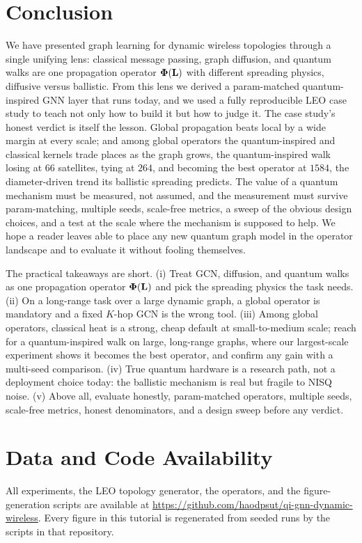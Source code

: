 \section{Conclusion}
\label{sec:conclusion}

We have presented graph learning for dynamic wireless topologies through a single
unifying lens: classical message passing, graph diffusion, and quantum walks are one
propagation operator $\boldsymbol{\Phi}(\mathbf{L})$ with different spreading physics, diffusive versus
ballistic. From this lens we derived a param-matched quantum-inspired GNN layer that
runs today, and we used a fully reproducible LEO case study to teach not only how to
build it but how to judge it. The case study's honest verdict is itself the lesson. Global propagation beats local by
a wide margin at every scale; and among global operators the quantum-inspired and
classical kernels trade places as the graph grows, the quantum-inspired walk losing at
$66$ satellites, tying at $264$, and becoming the best operator at $1584$, the
diameter-driven trend its ballistic spreading predicts. The value of a quantum mechanism
must be measured, not assumed, and the measurement must survive param-matching, multiple
seeds, scale-free metrics, a sweep of the obvious design choices, and a test at the scale
where the mechanism is supposed to help. We hope a reader leaves able to place any new quantum graph model
in the operator landscape and to evaluate it without fooling themselves.

The practical takeaways are short. (i) Treat GCN, diffusion, and quantum walks as one
propagation operator $\boldsymbol{\Phi}(\mathbf{L})$ and pick the spreading physics the task needs. (ii) On
a long-range task over a large dynamic graph, a global operator is mandatory and a fixed
$K$-hop GCN is the wrong tool. (iii) Among global operators, classical heat is a strong,
cheap default at small-to-medium scale; reach for a quantum-inspired walk on large,
long-range graphs, where our largest-scale experiment shows it becomes the best operator,
and confirm any gain with a multi-seed comparison. (iv) True
quantum hardware is a research path, not a deployment choice today: the ballistic
mechanism is real but fragile to NISQ noise. (v) Above all, evaluate honestly,
param-matched operators, multiple seeds, scale-free metrics, honest denominators, and a
design sweep before any verdict.

\section*{Data and Code Availability}
All experiments, the LEO topology generator, the operators, and the figure-generation
scripts are available at \url{https://github.com/haodpsut/qi-gnn-dynamic-wireless}.
Every figure in this tutorial is regenerated from seeded runs by the scripts in that
repository.
